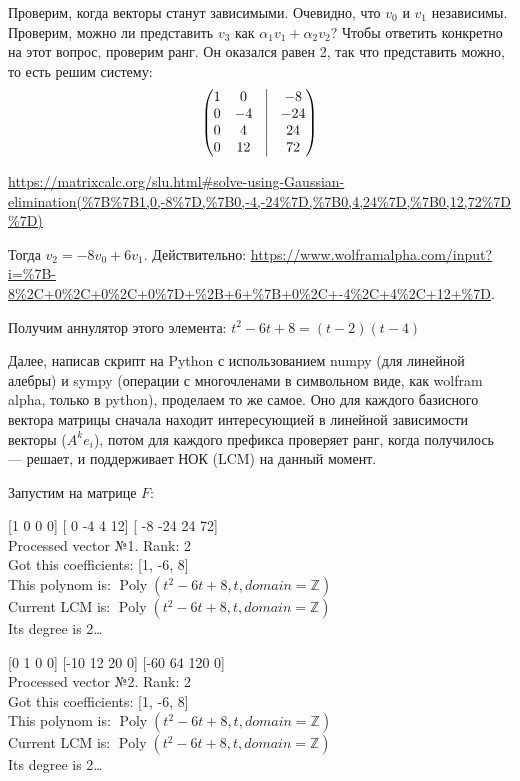 \documentclass[12pt, a4paper]{article}
\begin{document}
    Проверим, когда векторы станут зависимыми.
    Очевидно, что $v_0$ и $v_1$ независимы.
    Проверим, можно ли представить $v_3$ как $\alpha_1 v_1 + \alpha_2 v_2$?
    Чтобы ответить конкретно на этот вопрос, проверим ранг. Он оказался равен 2, так что представить можно, то есть решим систему:
    \begin{equation}
        \left(\begin{matrix}
            1 & 0  & \vrule&  -8 \\
            0 & -4 & \vrule  & -24\\
            0 & 4  & \vrule&  24 \\
            0 & 12 & \vrule  & 72
        \end{matrix}\right)
    \end{equation}

    \url{https://matrixcalc.org/slu.html#solve-using-Gaussian-elimination(%7B%7B1,0,-8%7D,%7B0,-4,-24%7D,%7B0,4,24%7D,%7B0,12,72%7D%7D)}

    Тогда $v_2 = -8 v_0 + 6v_1$. 
    Действительно: \url{https://www.wolframalpha.com/input?i=%7B-8%2C+0%2C+0%2C+0%7D+%2B+6+%7B+0%2C+-4%2C+4%2C+12+%7D}.

    Получим аннулятор этого элемента: $t^2 - 6t + 8 = (t - 2)(t - 4)$

    Далее, написав скрипт на Python с использованием numpy (для линейной алебры) и sympy (операции с многочленами в символьном виде, как wolfram alpha, только в python), проделаем то же самое.
    Оно для каждого базисного вектора матрицы сначала находит интересующией в линейной зависимости векторы ($A^k e_i$), потом для каждого префикса проверяет ранг, когда получилось — решает, 
    и поддерживает НОК (LCM) на данный момент.

    Запустим на матрице $F$:

    [1 0 0 0] [ 0 -4  4 12] [ -8 -24  24  72] \\
    Processed vector №1. Rank: 2\\
    Got this coefficients: [1, -6, 8]\\
    This polynom is: $\operatorname{Poly}{\left( t^{2} - 6 t + 8, t, domain=\mathbb{Z} \right)}$\\
    Current LCM is: $\operatorname{Poly}{\left( t^{2} - 6 t + 8, t, domain=\mathbb{Z} \right)}$\\
    Its degree is 2…
    
    [0 1 0 0] [-10  12  20   0] [-60  64 120   0] \\
    Processed vector №2. Rank: 2\\
    Got this coefficients: [1, -6, 8]\\
    This polynom is: $\operatorname{Poly}{\left( t^{2} - 6 t + 8, t, domain=\mathbb{Z} \right)}$\\
    Current LCM is: $\operatorname{Poly}{\left( t^{2} - 6 t + 8, t, domain=\mathbb{Z} \right)}$\\
    Its degree is 2…
    
\end{document}
